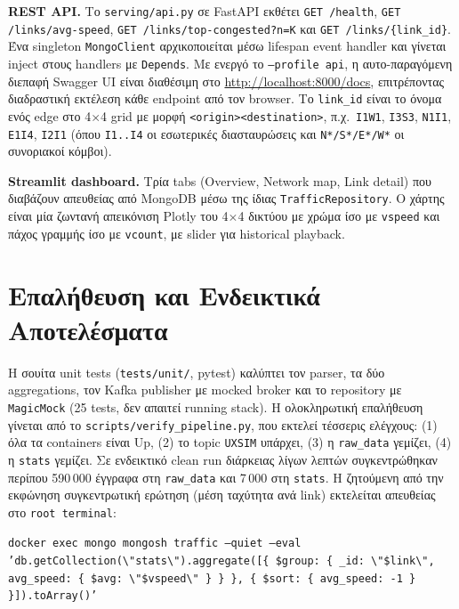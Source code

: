 \documentclass[11pt,a4paper]{article}
\newcommand{\code}[1]{\texttt{\small #1}}
\begin{document}
\textbf{REST API.} Το \code{serving/api.py} σε FastAPI εκθέτει \code{GET /health}, \code{GET /links/avg-speed}, \code{GET /links/top-congested?n=K} και \code{GET /links/\{link\_id\}}. Ένα singleton \code{MongoClient} αρχικοποιείται μέσω lifespan event handler και γίνεται inject στους handlers με \code{Depends}. Με ενεργό το \code{--profile api}, η αυτο-παραγόμενη διεπαφή Swagger UI είναι διαθέσιμη στο \url{http://localhost:8000/docs}, επιτρέποντας διαδραστική εκτέλεση κάθε endpoint από τον browser. Το \code{link\_id} είναι το όνομα ενός edge στο 4$\times$4 grid με μορφή \code{<origin><destination>}, π.χ.\ \code{I1W1}, \code{I3S3}, \code{N1I1}, \code{E1I4}, \code{I2I1} (όπου \code{I1..I4} οι εσωτερικές διασταυρώσεις και \code{N*/S*/E*/W*} οι συνοριακοί κόμβοι).

\textbf{Streamlit dashboard.} Τρία tabs (Overview, Network map, Link detail) που διαβάζουν απευθείας από MongoDB μέσω της ίδιας \code{TrafficRepository}. Ο χάρτης είναι μία ζωντανή απεικόνιση Plotly του 4$\times$4 δικτύου με χρώμα ίσο με \code{vspeed} και πάχος γραμμής ίσο με \code{vcount}, με slider για historical playback.

\section{Επαλήθευση και Ενδεικτικά Αποτελέσματα}
Η σουίτα unit tests (\code{tests/unit/}, pytest) καλύπτει τον parser, τα δύο aggregations, τον Kafka publisher με mocked broker και το repository με \code{MagicMock} (25 tests, δεν απαιτεί running stack). Η ολοκληρωτική επαλήθευση γίνεται από το \code{scripts/verify\_pipeline.py}, που εκτελεί τέσσερις ελέγχους: (1) όλα τα containers είναι Up, (2) το topic \code{UXSIM} υπάρχει, (3) η \code{raw\_data} γεμίζει, (4) η \code{stats} γεμίζει. Σε ενδεικτικό clean run διάρκειας λίγων λεπτών συγκεντρώθηκαν περίπου 590\,000 έγγραφα στη \code{raw\_data} και 7\,000 στη \code{stats}. Η ζητούμενη από την εκφώνηση συγκεντρωτική ερώτηση (μέση ταχύτητα ανά link) εκτελείται απευθείας στο \code{root terminal}:

\begin{center}\small
\code{docker exec mongo mongosh traffic --quiet --eval 'db.getCollection(\textbackslash"stats\textbackslash").aggregate([\{ \$group: \{ \_id: \textbackslash"\$link\textbackslash", avg\_speed: \{ \$avg: \textbackslash"\$vspeed\textbackslash" \} \} \}, \{ \$sort: \{ avg\_speed: -1 \} \}]).toArray()'}
\end{center}
\end{document}
